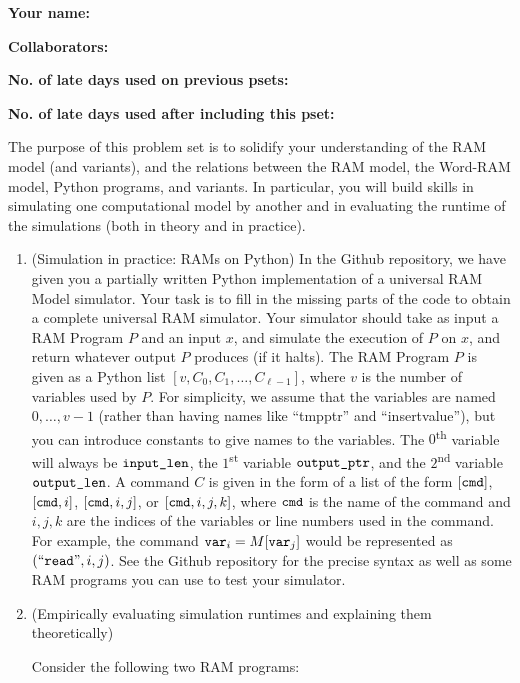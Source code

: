 \documentclass[11pt]{article}
\begin{document}

\textbf{Your name: }

\textbf{Collaborators: }

\textbf{No. of late days used on previous psets: }

\textbf{No. of late days used after including this pset: }


The purpose of this problem set is to solidify your understanding of the RAM model (and variants), and the relations between the RAM model, the Word-RAM model, Python programs, and variants. In particular, you will build skills in simulating one computational model by another and in evaluating the runtime of the simulations (both in theory and in practice).

\begin{enumerate}
 
    \item (Simulation in practice: RAMs on Python)  
    In the Github repository, we have given you a partially written Python implementation of a universal RAM Model simulator.  Your task is to fill in the missing parts of the code to obtain a complete universal RAM simulator.
     Your simulator should take as input a RAM Program $P$ and an input $x$, and simulate the execution of $P$ on $x$, and return whatever output $P$ produces (if it halts).  The RAM Program $P$ is given as a Python list $[v,C_0,C_1,\ldots,C_{\ell-1}]$, where $v$ is the number of variables used by $P$.  For simplicity, we assume that the variables are named $0,\ldots,v-1$ (rather than having names like ``tmpptr'' and ``insertvalue''), but you can introduce constants to give names to the variables.  The $0$\textsuperscript{th} variable will always be $\texttt{input\_len}$, the $1$\textsuperscript{st} variable $\texttt{output\_ptr}$, and the $2$\textsuperscript{nd} variable $\texttt{output\_len}$.  A command $C$ is given in the form of a list of the form $[\texttt{cmd}]$, $[\texttt{cmd},i]$, $[\texttt{cmd},i,j]$, or $[\texttt{cmd},i,j,k]$, where $\texttt{cmd}$ is the name of the command and $i,j,k$ are the indices of the variables or line numbers used in the command.  For example,  the command $\texttt{var}_i = M[\texttt{var}_j]$ would be represented as $(``\texttt{read}",i,j)$.  See the Github repository for the precise syntax as well as some RAM programs you can use to test your simulator.

    \item (Empirically evaluating simulation runtimes and explaining them theoretically)  

Consider the following two RAM programs:


\end{enumerate}
\end{document}
